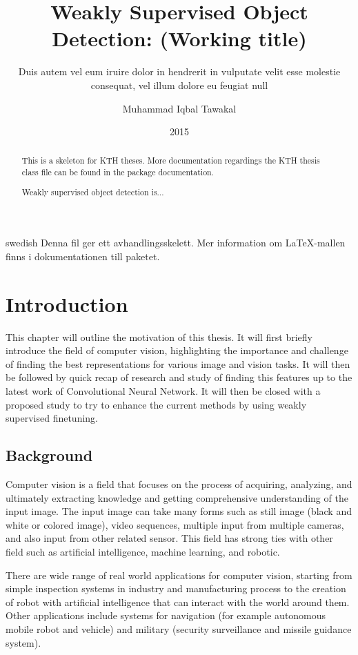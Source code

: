 \documentclass[a4paper,11pt]{kth-mag}
\title{Weakly Supervised Object Detection: (Working title)}
\subtitle{Duis autem vel eum iruire dolor in hendrerit in
          vulputate velit esse molestie consequat, vel illum
          dolore eu feugiat null}
\author{Muhammad Iqbal Tawakal}
\date{2015}
\begin{document}
\frontmatter
\pagestyle{empty}
\removepagenumbers
\maketitle
{}

\begin{abstract}
  This is a skeleton for KTH theses. More documentation
  regardings the KTH thesis class file can be found in
  the package documentation.
  
  Weakly supervised object detection is...
\end{abstract}

\clearpage
\begin{foreignabstract}{swedish}
  Denna fil ger ett avhandlingsskelett.
  Mer information om \LaTeX-mallen finns i
  dokumentationen till paketet.

\end{foreignabstract}
\clearpage
\tableofcontents*
\mainmatter
\pagestyle{newchap}


\chapter{Introduction}
\label{chap:intro}
This chapter will outline the motivation of this thesis. It will first briefly introduce the field of computer vision, highlighting the importance and challenge of finding the best representations for various image and vision tasks. It will then be followed by quick recap of research and study of finding this features up to the latest work of Convolutional Neural Network. It will then be closed with a proposed study to try to enhance the current methods by using weakly supervised finetuning.

\section{Background}
Computer vision is a field that focuses on the process of acquiring, analyzing, and ultimately extracting knowledge and getting comprehensive understanding of the input image. The input image can take many forms such as still image (black and white or colored image), video sequences, multiple input from multiple cameras, and also input from other related sensor. This field has strong ties with other field such as artificial intelligence, machine learning, and robotic.

There are wide range of real world applications for computer vision, starting from simple inspection systems in industry and manufacturing process to the creation of robot with artificial intelligence that can interact with  the world around them. Other applications include systems for navigation (for example autonomous mobile robot and vehicle) and military (security surveillance and missile guidance system).
\end{document}
